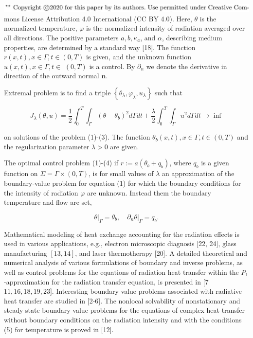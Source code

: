 \documentclass[10pt]{article}
\begin{document}
\includegraphics[max width=\textwidth, center]{2022_12_28_417a2ab16b2d49239661g-01}
mons License Attribution 4.0 International (CC BY 4.0). Here, $\theta$ is the normalized temperature, $\varphi$ is the normalized intensity of radiation averaged over all directions. The positive parameters $a, b, \kappa_{a}$, and $\alpha$, describing medium properties, are determined by a standard way [18]. The function $r(x, t), x \in \Gamma, t \in(0, T)$ is given, and the unknown function $u(x, t), x \in \Gamma, t \in$ $(0, T)$ is a control. By $\partial_{n}$ we denote the derivative in direction of the outward normal $\mathbf{n}$.

Extremal problem is to find a triple $\left\{\theta_{\lambda}, \varphi_{\lambda}, u_{\lambda}\right\}$ such that

$$
J_{\lambda}(\theta, u)=\frac{1}{2} \int_{0}^{T} \int_{\Gamma}\left(\theta-\theta_{b}\right)^{2} d \Gamma d t+\frac{\lambda}{2} \int_{0}^{T} \int_{\Gamma} u^{2} d \Gamma d t \rightarrow \inf
$$

on solutions of the problem (1)-(3). The function $\theta_{b}(x, t), x \in \Gamma, t \in(0, T)$ and the regularization parameter $\lambda>0$ are given.

The optimal control problem (1)-(4) if $r:=a\left(\theta_{b}+q_{b}\right)$, where $q_{b}$ is a given function on $\Sigma=\Gamma \times(0, T)$, is for small values of $\lambda$ an approximation of the boundary-value problem for equation (1) for which the boundary conditions for the intensity of radiation $\varphi$ are unknown. Instead them the boundary temperature and flow are set,

$$
\left.\theta\right|_{\Gamma}=\theta_{b},\left.\quad \partial_{n} \theta\right|_{\Gamma}=q_{b} .
$$

Mathematical modeling of heat exchange accounting for the radiation effects is used in various applications, e.g., electron microscopic diagnosis [22, 24], glass manufacturing $[13,14]$, and laser thermotherapy [20]. A detailed theoretical and numerical analysis of various formulations of boundary and inverse problems, as well as control problems for the equations of radiation heat transfer within the $P_{1}$-approximation for the radiation transfer equation, is presented in [7$11,16,18,19,23]$. Interesting boundary value problems associated with radiative heat transfer are studied in [2-6]. The nonlocal solvability of nonstationary and steady-state boundary-value problems for the equations of complex heat transfer without boundary conditions on the radiation intensity and with the conditions (5) for temperature is proved in [12].
\end{document}
